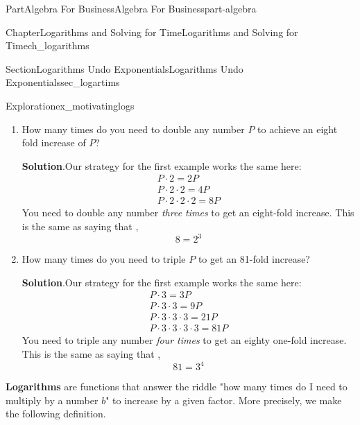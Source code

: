 \documentclass[oneside,10pt,]{tufte-book}
\newcommand{\blocktitlefont}{\relax}
\newcommand{\terminology}[1]{\textbf{#1}}
\numberwithin{equation}{chapter}
\begin{document}
\begin{partptx}{Part}{Algebra For Business}{}{Algebra For Business}{}{}{part-algebra}
\begin{chapterptx}{Chapter}{Logarithms and Solving for Time}{}{Logarithms and Solving for Time}{}{}{ch_logarithms}
\begin{sectionptx}{Section}{Logarithms Undo Exponentials}{}{Logarithms Undo Exponentials}{}{}{sec_logartims}
\begin{exploration}{Exploration}{}{ex_motivatinglogs}
\begin{enumerate}[font=\bfseries,label=(\alph*),ref=\alph*]
\noindent\textbf{\blocktitlefont Solution}.\hypertarget{ex_motivatinglogs-1-2}{}\quad{}Just start doubling 10, and see what works!%
\begin{gather*}
10 \cdot 2 = 20 \\
10 \cdot 2 \cdot 2 = 40 \\
10 \cdot 2 \cdot 2 \cdot 2 = 80 
\end{gather*}
You need to double 10 \emph{three times} to get from 10 to 80 (an eight-fold increase). In other words,%
\begin{equation*}
80 = 10 \cdot 2^3
\end{equation*}
%
\item{}How many times do you need to double any number \(P\) to achieve an eight fold increase of \(P\)?%
\par\smallskip%
\noindent\textbf{\blocktitlefont Solution}.\hypertarget{ex_motivatinglogs-2-2}{}\quad{}Our strategy for the first example works the same here:%
\begin{gather*}
P \cdot 2 = 2 P \\
P \cdot 2 \cdot 2 = 4 P \\
P \cdot 2 \cdot 2 \cdot 2 = 8 P  
\end{gather*}
You need to double any number \emph{three times} to get an eight-fold increase. This is the same as saying that ,%
\begin{equation*}
8 =  2^3
\end{equation*}
%
\item{}How many times do you need to triple \(P\) to get an 81-fold increase?%
\par\smallskip%
\noindent\textbf{\blocktitlefont Solution}.\hypertarget{ex_motivatinglogs-3-2}{}\quad{}Our strategy for the first example works the same here:%
\begin{gather*}
P \cdot 3 = 3 P \\
P \cdot 3 \cdot 3 = 9 P \\
P \cdot 3\cdot 3 \cdot 3 = 21 P\\
P \cdot 3\cdot 3 \cdot 3 \cdot 3 = 81 P
\end{gather*}
You need to triple any number \emph{four times} to get an eighty one-fold increase. This is the same as saying that ,%
\begin{equation*}
81 =  3^4
\end{equation*}
%
\end{enumerate}%
\end{exploration}%
\terminology{Logarithms} are functions that answer the riddle "how many times do I need to multiply by a number \(b\)" to increase by a given factor. More precisely, we make the following definition.%

\end{sectionptx}
\end{chapterptx}
\end{partptx}
\end{document}
